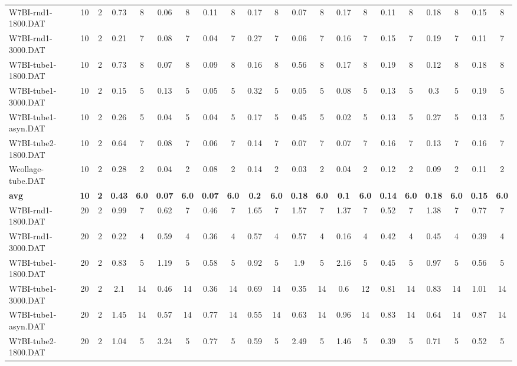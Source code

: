 \begin{sidewaystable}[!ht]
{\begin{tabular}{lcccccccccccccccccccc}
W7BI-rnd1-1800.DAT & 10 & 2 & 0.73 & 8 & 0.06 & 8 & 0.11 & 8 & 0.17 & 8 & 0.07 & 8 & 0.17 & 8 & 0.11 & 8 & 0.18 & 8 & 0.15 & 8 \\
W7BI-rnd1-3000.DAT & 10 & 2 & 0.21 & 7 & 0.08 & 7 & 0.04 & 7 & 0.27 & 7 & 0.06 & 7 & 0.16 & 7 & 0.15 & 7 & 0.19 & 7 & 0.11 & 7 \\
W7BI-tube1-1800.DAT & 10 & 2 & 0.73 & 8 & 0.07 & 8 & 0.09 & 8 & 0.16 & 8 & 0.56 & 8 & 0.17 & 8 & 0.19 & 8 & 0.12 & 8 & 0.18 & 8 \\
W7BI-tube1-3000.DAT & 10 & 2 & 0.15 & 5 & 0.13 & 5 & 0.05 & 5 & 0.32 & 5 & 0.05 & 5 & 0.08 & 5 & 0.13 & 5 & 0.3 & 5 & 0.19 & 5 \\
W7BI-tube1-asyn.DAT & 10 & 2 & 0.26 & 5 & 0.04 & 5 & 0.04 & 5 & 0.17 & 5 & 0.45 & 5 & 0.02 & 5 & 0.13 & 5 & 0.27 & 5 & 0.13 & 5 \\
W7BI-tube2-1800.DAT & 10 & 2 & 0.64 & 7 & 0.08 & 7 & 0.06 & 7 & 0.14 & 7 & 0.07 & 7 & 0.07 & 7 & 0.16 & 7 & 0.13 & 7 & 0.16 & 7 \\
Wcollage-tube.DAT & 10 & 2 & 0.28 & 2 & 0.04 & 2 & 0.08 & 2 & 0.14 & 2 & 0.03 & 2 & 0.04 & 2 & 0.12 & 2 & 0.09 & 2 & 0.11 & 2 \\
\cline{1-21} \textbf{avg} & \textbf{10} & \textbf{2} & \textbf{0.43} & \textbf{6.0} & \textbf{0.07} & \textbf{6.0} & \textbf{0.07} & \textbf{6.0} & \textbf{0.2} & \textbf{6.0} & \textbf{0.18} & \textbf{6.0} & \textbf{0.1} & \textbf{6.0} & \textbf{0.14} & \textbf{6.0} & \textbf{0.18} & \textbf{6.0} & \textbf{0.15} & \textbf{6.0} \\ \cline{1-21}
W7BI-rnd1-1800.DAT & 20 & 2 & 0.99 & 7 & 0.62 & 7 & 0.46 & 7 & 1.65 & 7 & 1.57 & 7 & 1.37 & 7 & 0.52 & 7 & 1.38 & 7 & 0.77 & 7 \\
W7BI-rnd1-3000.DAT & 20 & 2 & 0.22 & 4 & 0.59 & 4 & 0.36 & 4 & 0.57 & 4 & 0.57 & 4 & 0.16 & 4 & 0.42 & 4 & 0.45 & 4 & 0.39 & 4 \\
W7BI-tube1-1800.DAT & 20 & 2 & 0.83 & 5 & 1.19 & 5 & 0.58 & 5 & 0.92 & 5 & 1.9 & 5 & 2.16 & 5 & 0.45 & 5 & 0.97 & 5 & 0.56 & 5 \\
W7BI-tube1-3000.DAT & 20 & 2 & 2.1 & 14 & 0.46 & 14 & 0.36 & 14 & 0.69 & 14 & 0.35 & 14 & 0.6 & 12 & 0.81 & 14 & 0.83 & 14 & 1.01 & 14 \\
W7BI-tube1-asyn.DAT & 20 & 2 & 1.45 & 14 & 0.57 & 14 & 0.77 & 14 & 0.55 & 14 & 0.63 & 14 & 0.96 & 14 & 0.83 & 14 & 0.64 & 14 & 0.87 & 14 \\
W7BI-tube2-1800.DAT & 20 & 2 & 1.04 & 5 & 3.24 & 5 & 0.77 & 5 & 0.59 & 5 & 2.49 & 5 & 1.46 & 5 & 0.39 & 5 & 0.71 & 5 & 0.52 & 5 \\

\end{tabular}}
\end{sidewaystable}
